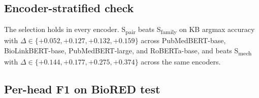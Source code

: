 \subsection{Encoder-stratified check}

The selection holds in every encoder. S\textsubscript{pair} beats
S\textsubscript{family} on KB argmax accuracy with
$\Delta\in\{+0.052, +0.127, +0.132, +0.159\}$ across PubMedBERT-base,
BioLinkBERT-base, PubMedBERT-large, and RoBERTa-base, and beats
S\textsubscript{mech} with $\Delta\in\{+0.144, +0.177, +0.275, +0.374\}$
across the same encoders.

\subsection{Per-head F1 on BioRED test}

